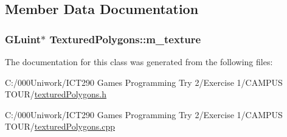 \subsection{Member Data Documentation}
\subsubsection[{\texorpdfstring{m\+\_\+texture}{m_texture}}]{\setlength{\rightskip}{0pt plus 5cm}G\+Luint$\ast$ Textured\+Polygons\+::m\+\_\+texture\hspace{0.3cm}{\ttfamily [private]}}\hypertarget{class_textured_polygons_a12e0d56cfe3cc9e906fdb7e457afb447}{}\label{class_textured_polygons_a12e0d56cfe3cc9e906fdb7e457afb447}


The documentation for this class was generated from the following files\+:\begin{DoxyCompactItemize}
\item 
C\+:/000\+Uniwork/\+I\+C\+T290 Games Programming Try 2/\+Exercise 1/\+C\+A\+M\+P\+U\+S T\+O\+U\+R/\hyperlink{textured_polygons_8h}{textured\+Polygons.\+h}\item 
C\+:/000\+Uniwork/\+I\+C\+T290 Games Programming Try 2/\+Exercise 1/\+C\+A\+M\+P\+U\+S T\+O\+U\+R/\hyperlink{textured_polygons_8cpp}{textured\+Polygons.\+cpp}\end{DoxyCompactItemize}
